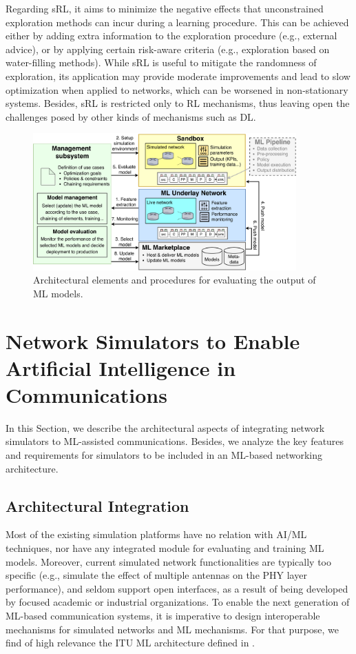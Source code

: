 \documentclass{article}
\begin{document}
	Regarding sRL, it aims to minimize the negative effects that unconstrained exploration methods can incur during a learning procedure. This can be achieved either by adding extra information to the exploration procedure (e.g., external advice), or by applying certain risk-aware criteria (e.g., exploration based on water-filling methods). While sRL is useful to mitigate the randomness of exploration, its application may provide moderate improvements and lead to slow optimization when applied to networks, which can be worsened in non-stationary systems. Besides, sRL is restricted only to RL mechanisms, thus leaving open the challenges posed by other kinds of mechanisms such as DL.
	
	\begin{figure}[ht!]
		\centering
		\includegraphics[width=0.9\textwidth]{architecture_example.pdf}
		\caption{Architectural elements and procedures for evaluating the output of ML models.}
		\label{fig:example_simulator}
	\end{figure}
		
	\section{Network Simulators to Enable Artificial Intelligence in Communications}	
	In this Section, we describe the architectural aspects of integrating network simulators to ML-assisted communications. Besides, we analyze the key features and requirements for simulators to be included in an ML-based networking architecture.
	
	\subsection{Architectural Integration}
	Most of the existing simulation platforms have no relation with AI/ML techniques, nor have any integrated module for evaluating and training ML models. Moreover, current simulated network functionalities are typically too specific (e.g., simulate the effect of multiple antennas on the PHY layer performance), and seldom support open interfaces, as a result of being developed by focused academic or industrial organizations. To enable the next generation of ML-based communication systems, it is imperative to design interoperable mechanisms for simulated networks and ML mechanisms. For that purpose, we find of high relevance the ITU ML architecture defined in \cite{ITU3172}.	
	
\end{document}
